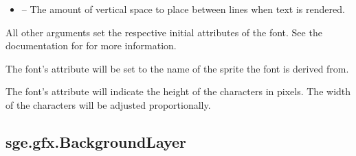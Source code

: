 \documentclass[letterpaper,10pt,english]{sphinxmanual}
\begin{document}
\begin{fulllineitems}
\begin{itemize}
\item {} 
 -- The amount of vertical space to place between
lines when text is rendered.

\end{itemize}

All other arguments set the respective initial attributes of the
font.  See the documentation for {\hyperref[gfx:sge.gfx.Font]{\emph{}}} for more
information.

The font's {\hyperref[gfx:sge.gfx.Font.name]{\emph{}}} attribute will be set to the name of the
sprite the font is derived from.

The font's {\hyperref[gfx:sge.gfx.Font.size]{\emph{}}} attribute will indicate the height of
the characters in pixels.  The width of the characters will be
adjusted proportionally.

\end{fulllineitems}



\subsection{sge.gfx.BackgroundLayer}
\label{gfx:sge-gfx-backgroundlayer}
\end{document}
